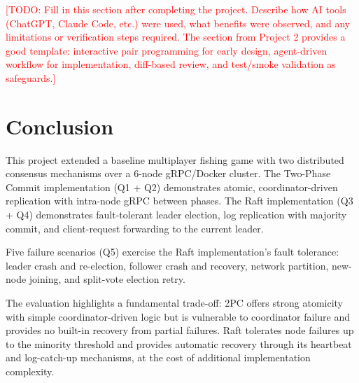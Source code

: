 \documentclass[11pt]{article}
\newcommand{\todo}[1]{\textcolor{red}{[TODO: #1]}}
\begin{document}
\todo{Fill in this section after completing the project. Describe how AI tools (ChatGPT, Claude Code, etc.) were used, what benefits were observed, and any limitations or verification steps required. The section from Project 2 provides a good template: interactive pair programming for early design, agent-driven workflow for implementation, diff-based review, and test/smoke validation as safeguards.}

\section{Conclusion}

This project extended a baseline multiplayer fishing game with two distributed consensus
mechanisms over a 6-node gRPC/Docker cluster.
The Two-Phase Commit implementation (Q1 + Q2) demonstrates atomic, coordinator-driven
replication with intra-node gRPC between phases.
The Raft implementation (Q3 + Q4) demonstrates fault-tolerant leader election, log
replication with majority commit, and client-request forwarding to the current leader.

Five failure scenarios (Q5) exercise the Raft implementation's fault tolerance:
leader crash and re-election, follower crash and recovery, network partition,
new-node joining, and split-vote election retry.

The evaluation highlights a fundamental trade-off: 2PC offers strong atomicity with simple
coordinator-driven logic but is vulnerable to coordinator failure and provides no
built-in recovery from partial failures.
Raft tolerates node failures up to the minority threshold and provides automatic recovery
through its heartbeat and log-catch-up mechanisms, at the cost of additional implementation
complexity.
\end{document}
